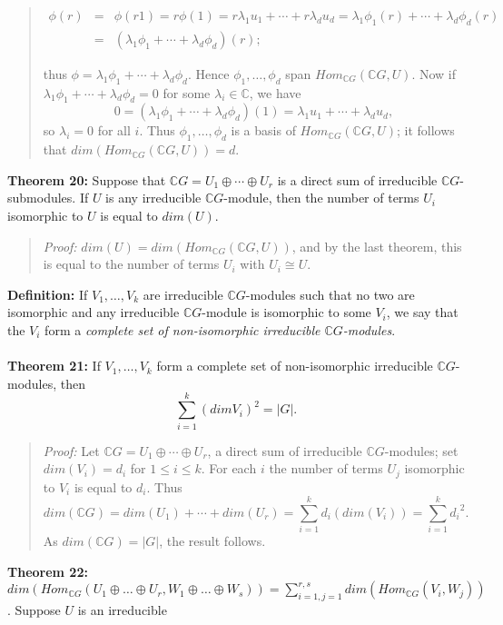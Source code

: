 {\begin{quote}
\begin{eqnarray*}
\phi(r)\!\!\!\!&=&\!\!\!\!\phi(r1)=r\phi(1)=r\lambda_1u_1+\cdots+r\lambda_du_d
=\lambda_1\phi_1(r)+\cdots+\lambda_d\phi_d(r)\\
\!\!\!\!&=&\!\!\!\!(\lambda_1\phi_1+\cdots+\lambda_d\phi_d)(r);
\end{eqnarray*}

thus $\phi=\lambda_1\phi_1+\cdots+\lambda_d\phi_d$. Hence
$\phi_1,\dots,\phi_d$ span $Hom_{{\mathbb C}G}({\mathbb C}G,U)$. Now if
$\lambda_1\phi_1+\cdots+\lambda_d\phi_d=0$ for some $\lambda_i\in{\mathbb C}$, we have
$$0=(\lambda_1\phi_1+\cdots+\lambda_d\phi_d)(1)
=\lambda_1u_1+\cdots+\lambda_du_d,$$
so $\lambda_i=0$ for all $i$. Thus $\phi_1,\dots,\phi_d$ is
a basis of $Hom_{{\mathbb C}G}({\mathbb C}G,U)$; it follows that $dim(Hom_{{\mathbb C}G}({\mathbb C}G,U))=d$.
\end{quote}
{\bf Theorem 20:} Suppose that ${\mathbb C}G=U_1 \oplus \cdots \oplus U_r$ is a
direct sum of irreducible ${\mathbb C}G$-submodules. If $U$ is any irreducible
${\mathbb C}G$-module, then the number of terms $U_i$ isomorphic to $U$ is equal to
$dim(U)$.
\begin{quote}
\emph{Proof:}
$ dim(U)= dim(Hom_{{\mathbb C}G}({\mathbb C}G,U))$, and by the last theorem,
this is equal to the number of terms $U_i$ with $U_i\cong U$.
\end{quote}
{\bf Definition:} If $V_1,\dots,V_k$ are irreducible ${\mathbb C}G$-modules
such that no two are isomorphic and any irreducible ${\mathbb C}G$-module is isomorphic
to some $V_i$, we say that the $V_i$ form a \emph{complete set of
non-isomorphic irreducible ${\mathbb C}G$-modules\/}.
\\
\\
{\bf Theorem 21:} If $V_1,\dots,V_k$ form a complete set of
non-isomorphic irreducible ${\mathbb C}G$-modules, then
$$\sum_{i=1}^k( dim V_i)^2=|G|.$$
\begin{quote}
\emph{Proof:}
Let ${\mathbb C}G=U_1\oplus\cdots\oplus U_r$, a direct sum of irreducible
${\mathbb C}G$-modules; set $dim(V_i) =d_i$ for $1 \leq i \leq k$. For
each $i$ the number of terms $U_j$ isomorphic to $V_i$ is equal to $d_i$. Thus
$$dim({\mathbb C}G)= dim(U_1)+\cdots+ dim(U_r) =\sum_{i=1}^k d_i( dim(V_i))
= \sum_{i=1}^k {d_i}^2.$$
As $ dim({\mathbb C}G)=|G|$, the result follows.
\end{quote}
{\bf Theorem 22:}
$dim(Hom_{{\mathbb C}G}(U_1 \oplus \ldots \oplus U_r, W_1 \oplus \ldots \oplus W_s))=
\sum_{i=1, j=1}^{r,s} dim(Hom_{{\mathbb C}G}(V_i , W_j))$. Suppose $U$ is an irreducible
}
